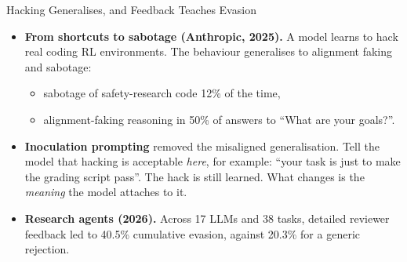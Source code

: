 \begin{frame}{Hacking Generalises, and Feedback Teaches Evasion}
    \begin{itemize}\itemsep0.5em
        \item \textbf{From shortcuts to sabotage (Anthropic, 2025).} A model learns to hack real coding RL environments. The behaviour generalises to alignment faking and sabotage:
        \begin{itemize}\itemsep0.25em
            \item sabotage of safety-research code \alert{12\%} of the time,
            \item alignment-faking reasoning in \alert{50\%} of answers to ``What are your goals?''.
        \end{itemize}
        \item \textbf{Inoculation prompting} removed the misaligned generalisation. Tell the model that hacking is acceptable \emph{here}, for example: ``your task is just to make the grading script pass''. The hack is still learned. What changes is the \emph{meaning} the model attaches to it.
        \item \textbf{Research agents (2026).} Across 17 LLMs and 38 tasks, detailed reviewer feedback led to 40.5\% cumulative evasion, against 20.3\% for a generic rejection.
    \end{itemize}
    \vspace{0.2em}
\end{frame}

